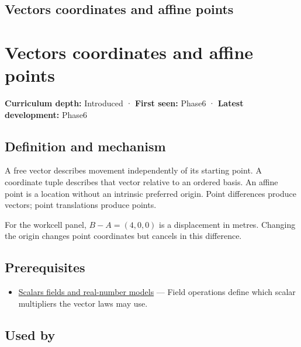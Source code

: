 \hypertarget{appendix-0659864c0aa3}{}
\section*{Vectors coordinates and affine points}
\chapter{Vectors coordinates and affine points}\label{appendix-0659864c0aa3-vectors-coordinates-and-affine-points}

\textbf{Curriculum depth:} Introduced · \textbf{First seen:} Phase6 · \textbf{Latest development:} Phase6

\section{Definition and mechanism}\label{appendix-0659864c0aa3-definition-and-mechanism}

A free vector describes movement independently of its starting point. A coordinate tuple describes that vector relative to an ordered basis. An affine point is a location without an intrinsic preferred origin. Point differences produce vectors; point translations produce points.

For the workcell panel, \(B-A=(4,0,0)\) is a displacement in metres. Changing the origin changes point coordinates but cancels in this difference.

\section{Prerequisites}\label{appendix-0659864c0aa3-prerequisites}

\begin{itemize}
\tightlist
\item
  \hyperref[appendix-52051ad550fe]{Scalars fields and real-number models} --- Field operations define which scalar multipliers the vector laws may use.
\end{itemize}

\section{Used by}\label{appendix-0659864c0aa3-used-by}

